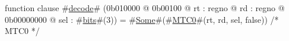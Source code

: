 function clause #\hyperref[zdecode]{decode}# (0b010000 @ 0b00100 @ rt : regno @ rd : regno @ 0b00000000 @ sel : #\hyperref[zbits]{bits}#(3)) =
  #\hyperref[zSome]{Some}#(#\hyperref[zMTCzero]{MTC0}#(rt, rd, sel, false)) /* MTC0 */
